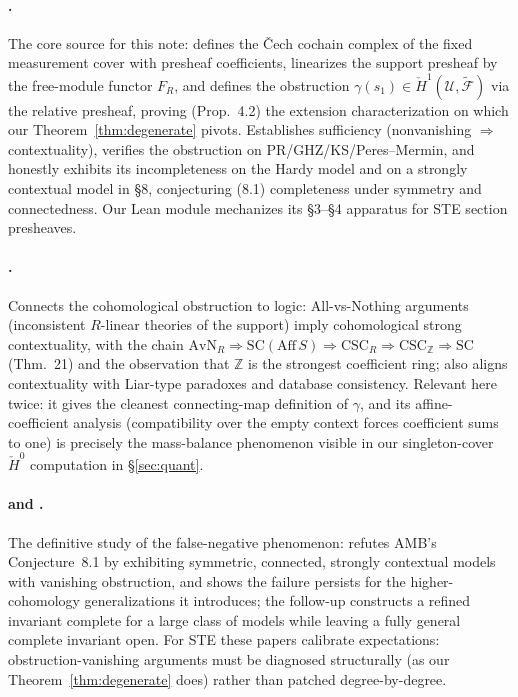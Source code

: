 \documentclass[11pt]{article}
\newcommand{\cech}{\v{C}ech}
\newcommand{\Hc}[1]{\check{H}^{#1}}
\newcommand{\Z}{\mathbb{Z}}
\begin{document}
\paragraph{\citet{abramsky2012cohomology}.}
The core source for this note: defines the \cech{} cochain complex of
the fixed measurement cover with presheaf coefficients, linearizes the
support presheaf by the free-module functor $F_R$, and defines the
obstruction $\gamma(s_1) \in \Hc{1}(\mathcal{U},\tilde{\mathcal{F}})$
via the relative presheaf, proving (Prop.~4.2) the extension
characterization on which our Theorem~\ref{thm:degenerate} pivots.
Establishes sufficiency (nonvanishing $\Rightarrow$ contextuality),
verifies the obstruction on PR/GHZ/KS/Peres--Mermin, and honestly
exhibits its incompleteness on the Hardy model and on a strongly
contextual model in \S8, conjecturing (8.1) completeness under
symmetry and connectedness.  Our Lean module mechanizes its \S3--\S4
apparatus for STE section presheaves.

\paragraph{\citet{abramsky2015paradox}.}
Connects the cohomological obstruction to logic: All-vs-Nothing
arguments (inconsistent $R$-linear theories of the support) imply
cohomological strong contextuality, with the chain
$\mathrm{AvN}_R \Rightarrow \mathrm{SC}(\mathrm{Aff}\,S) \Rightarrow
\mathrm{CSC}_R \Rightarrow \mathrm{CSC}_\Z \Rightarrow \mathrm{SC}$
(Thm.~21) and the observation that $\Z$ is the strongest coefficient
ring; also aligns contextuality with Liar-type paradoxes and database
consistency.  Relevant here twice: it gives the cleanest
connecting-map definition of $\gamma$, and its affine-coefficient
analysis (compatibility over the empty context forces coefficient sums
to one) is precisely the mass-balance phenomenon visible in our
singleton-cover $\Hc{0}$ computation in \S\ref{sec:quant}.

\paragraph{\citet{caru2017cohomology} and \citet{caru2018complete}.}
The definitive study of the false-negative phenomenon: refutes AMB's
Conjecture~8.1 by exhibiting symmetric, connected, strongly contextual
models with vanishing obstruction, and shows the failure persists for
the higher-cohomology generalizations it introduces; the follow-up
constructs a refined invariant complete for a large class of models
while leaving a fully general complete invariant open.  For STE these
papers calibrate expectations: obstruction-vanishing arguments must be
diagnosed structurally (as our Theorem~\ref{thm:degenerate} does)
rather than patched degree-by-degree.
\end{document}
